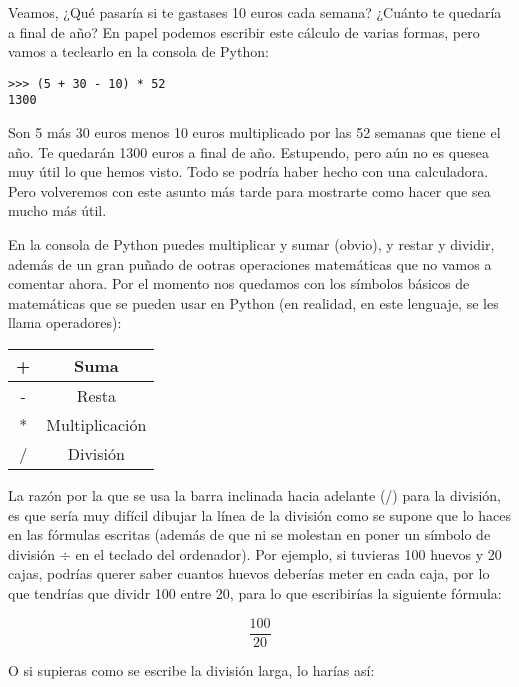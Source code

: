 Veamos, ¿Qué pasaría si te gastases 10 euros cada semana? ¿Cuánto te quedaría a final de año? En papel podemos escribir este cálculo de varias formas, pero vamos a teclearlo en la consola de Python: 

\begin{listing}
\begin{verbatim}
>>> (5 + 30 - 10) * 52
1300
\end{verbatim}
\end{listing}

Son 5 más 30 euros menos 10 euros multiplicado por las 52 semanas que tiene el año. Te quedarán 1300 euros a final de año. Estupendo, pero aún no es quesea muy útil lo que hemos visto. Todo se podría haber hecho con una calculadora. Pero volveremos con este asunto más tarde para mostrarte como hacer que sea mucho más útil.  

En la consola de Python puedes multiplicar y sumar (obvio), y restar y dividir, además de un gran puñado de ootras operaciones matemáticas que no vamos a comentar ahora. Por el momento nos quedamos con los símbolos básicos de matemáticas que se pueden usar en Python (en realidad, en este lenguaje, se les llama operadores):

\begin{center}
\begin{tabular}{|c|c|}
\hline
+ & Suma \\
\hline
- & Resta \\
\hline
* & Multiplicación \\
\hline
/ & División \\
\hline
\end{tabular}
\end{center}

La razón por la que se usa la barra inclinada hacia adelante (/) para la división, es que sería muy difícil dibujar la línea de la división como se supone que lo haces en las fórmulas escritas (además de que ni se molestan en poner un símbolo de división $\div$ en el teclado del ordenador). Por ejemplo, si tuvieras 100 huevos y 20 cajas, podrías querer saber cuantos huevos deberías meter en cada caja, por lo que tendrías que dividr 100 entre 20, para lo que escribirías la siguiente fórmula:

\begin{displaymath}
\frac{100}{20}
\end{displaymath}

O si supieras como se escribe la división larga, lo harías así:

